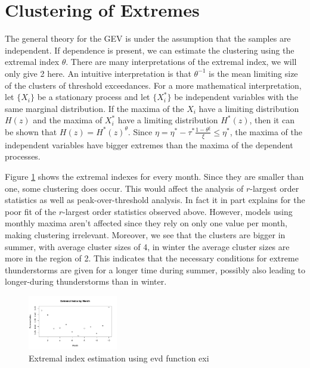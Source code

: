 \documentclass[10pt,conference,compsocconf]{IEEEtran}
\begin{document}
\section*{Clustering of Extremes}
The general theory for the GEV is under the assumption that the samples are independent. If dependence is present, we can estimate the clustering using the extremal index $\theta$. There are many interpretations of the extremal index, we will only give 2 here. An intuitive interpretation is that $\theta^{-1}$ is the mean limiting size of the clusters of threshold exceedances. For a more mathematical interpretation, let $\{X_i\}$ be a stationary process and let  $\{X_i^*\}$ be independent variables with the same marginal distribution. If the maxima of the $X_i$ have a limiting distribution $H(z)$ and the maxima of $X_i^*$ have a limiting distribution $H^*(z)$, then it can be shown that $H(z)=H^*(z)^\theta$. Since $\eta=\eta^*-\tau^*\frac{1-\theta^\xi}{\xi}\leq\eta^*$, the maxima of the independent variables have bigger extremes than the maxima of the dependent processes. 
\par
Figure \ref{fig:extremal_index} shows the extremal indexes for every month. Since they are smaller than one, some clustering does occur. This would affect the analysis of $r$-largest order statistics as well as peak-over-threshold analysis. In fact it in part explains for the poor fit of the $r$-largest order statistics observed above. However, models using monthly maxima aren't affected since they rely on only one value per month, making clustering irrelevant. Moreover, we see that the clusters are bigger in summer, with average cluster sizes of 4, in winter the average cluster sizes are more in the region of 2. This indicates that the necessary conditions for extreme thunderstorms are given for a longer time during summer, possibly also leading to longer-during thunderstorms than in winter. 

\begin{figure}
	\centering
	\includegraphics[width=0.35\textwidth]{../plots/extermal_index.pdf}
	\caption{Extremal index estimation using evd function exi}
	\label{fig:extremal_index}
\end{figure}
\end{document}

